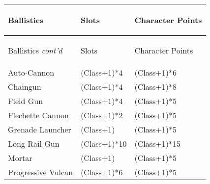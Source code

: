 \documentclass[twoside]{book}
\begin{document}
\begin{longtable}{p{1.25in}ll} 
  Ballistics
  &
  \begin{turn}{70}{Slots}\end{turn}
          
  &
  \begin{turn}{70}{Character Points}\end{turn}
          
  \\
  \hline
  \hline
  \endfirsthead
  Ballistics \textit{cont'd}
        
  &
  \begin{turn}{70}{Slots}\end{turn}
          
  &
  \begin{turn}{70}{Character Points}\end{turn}
          
  \\
  \endhead
      
  \raggedright
           Auto-Cannon 
  &
   (Class+1)*4 
  &
   (Class+1)*6
           
  \tabularnewline
  \hline
      
  \raggedright
           Chaingun 
  &
   (Class+1)*4 
  &
   (Class+1)*8
           
  \tabularnewline
  \hline
      
  \raggedright
           Field Gun 
  &
   (Class+1)*4 
  &
   (Class+1)*5
           
  \tabularnewline
  \hline
      
  \raggedright
           Flechette Cannon 
  &
   (Class+1)*2 
  &
   (Class+1)*5
           
  \tabularnewline
  \hline
      
  \raggedright
           Grenade Launcher 
  &
   (Class+1) 
  &
   (Class+1)*5
           
  \tabularnewline
  \hline
      
  \raggedright
           Long Rail Gun 
  &
   (Class+1)*10 
  &
   (Class+1)*15
           
  \tabularnewline
  \hline
      
  \raggedright
           Mortar 
  &
   (Class+1) 
  &
   (Class+1)*5
           
  \tabularnewline
  \hline
      
  \raggedright
           Progressive Vulcan 
  &
   (Class+1)*6 
  &
   (Class+1)*5
           

\end{longtable}
\end{document}
